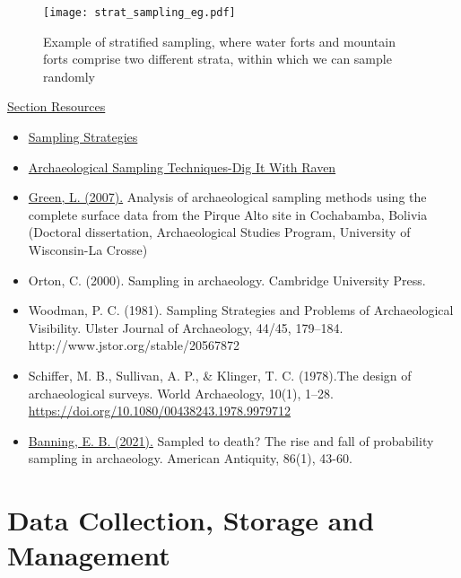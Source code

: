 \documentclass{article}
\begin{document}
\begin{figure}[hbt!]
    \centering
    \texttt{[image: strat\_sampling\_eg.pdf]}
    \caption{Example of stratified sampling, where water forts and mountain forts comprise two different strata, within which we can sample randomly}
    \label{fig:strat_sampling}
\end{figure}
\underline{Section Resources}

\begin{itemize}
    \item \href{https://la.utexas.edu/users/denbow/labs/survey.htm}{Sampling Strategies}
    \item \href{https://www.youtube.com/watch?v=ZxrQeqPi-Nw}{Archaeological Sampling Techniques-Dig It With Raven}
    \item \href{https://www.uwlax.edu/globalassets/offices-services/urc/jur-online/pdf/2007/green.pdf}{Green, L. (2007).} Analysis of archaeological sampling methods using the complete surface data from the Pirque Alto site in Cochabamba, Bolivia (Doctoral dissertation, Archaeological Studies Program, University of Wisconsin-La Crosse)
    \item Orton, C. (2000). Sampling in archaeology. Cambridge University Press.
    \item \protect\hypertarget{woodman}{Woodman, P. C. (1981). Sampling Strategies and Problems of Archaeological Visibility. Ulster Journal of Archaeology, 44/45, 179–184.} http://www.jstor.org/stable/20567872
    \item\protect\hypertarget{schiffer}{Schiffer, M. B., Sullivan, A. P., \& Klinger, T. C. (1978).The design of archaeological surveys. World Archaeology, 10(1), 1–28.} \href{https://www.researchgate.net/profile/Michael-Schiffer/publication/200459320_The_Design_of_Archaeological_Surveys/links/551be9090cf20d5fbde221d7/The-Design-of-Archaeological-Surveys.pdf}{https://doi.org/10.1080/00438243.1978.9979712}
    \item \href{https://www.cambridge.org/core/services/aop-cambridge-core/content/view/8E04AE2B0B1C3D4F46A0CF93F33FF874/S0002731620000396a.pdf/sampled_to_death_the_rise_and_fall_of_probability_sampling_in_archaeology.pdf}{\protect\hypertarget{banning}{Banning, E. B. (2021)}.} Sampled to death? The rise and fall of probability sampling in archaeology. American Antiquity, 86(1), 43-60.
\end{itemize}

\section{Data Collection, Storage and Management}
\end{document}
